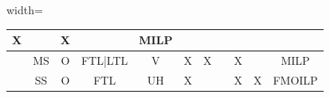 \begin{table}[h!]
\begin{adjustbox}{width=\textwidth}
\begin{tabular}{|c|c|c|c|c|c|c|l|c|c|c|}
      X                                                                                  &                &
      X                                                                                  &
                                                                                         &
      MILP                                                                                                                                              \\ \hline
      \autocite{Schoneberg2013ANetworks}                                                 &
      MS                                                                                 &
      O                                                                                  &
      FTL|LTL                                                                            &
      V                                                                                  &
      X                                                                                  &
      X                                                                                  &                &
      X                                                                                  &
                                                                                         &
      MILP                                                                                                                                              \\ \hline
      \autocite{Diaz-Madronero2014APlanning}
                                                                                         &
      SS                                                                                 &
      O                                                                                  &
      FTL                                                                                &
      UH                                                                                 &
      X                                                                                  &
                                                                                         &                &
      X                                                                                  &
      X                                                                                  &
      FMOILP                                                                                                                                            \\ \hline

\end{tabular}
\end{adjustbox}
\end{table}
